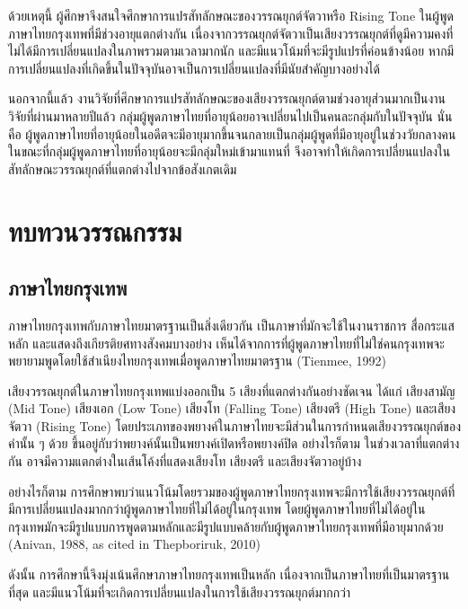 \documentclass[a4paper]{article}
\begin{document}
    ด้วยเหตุนี้ ผู้ศึกษาจึงสนใจศึกษาการแปรสัทลักษณะของวรรณยุกต์จัตวาหรือ Rising Tone ในผู้พูดภาษาไทยกรุงเทพที่มีช่วงอายุแตกต่างกัน เนื่องจากวรรณยุกต์จัตวาเป็นเสียงวรรณยุกต์ที่ดูมีความคงที่ ไม่ได้มีการเปลี่ยนแปลงในภาพรวมตามเวลามากนัก และมีแนวโน้มที่จะมีรูปแปรที่ค่อนข้างน้อย หากมีการเปลี่ยนแปลงที่เกิดขึ้นในปัจจุบันอาจเป็นการเปลี่ยนแปลงที่มีนัยสำคัญบางอย่างได้

    นอกจากนี้แล้ว งานวิจัยที่ศึกษาการแปรสัทลักษณะของเสียงวรรณยุกต์ตามช่วงอายุส่วนมากเป็นงานวิจัยที่ผ่านมาหลายปีแล้ว กลุ่มผู้พูดภาษาไทยที่อายุน้อยอาจเปลี่ยนไปเป็นคนละกลุ่มกับในปัจจุบัน นั่นคือ ผู้พูดภาษาไทยที่อายุน้อยในอดีตจะมีอายุมากขึ้นจนกลายเป็นกลุ่มผู้พูดที่มีอายุอยู่ในช่วงวัยกลางคน ในขณะที่กลุ่มผู้พูดภาษาไทยที่อายุน้อยจะมีกลุ่มใหม่เข้ามาแทนที่ จึงอาจทำให้เกิดการเปลี่ยนแปลงในสัทลักษณะวรรณยุกต์ที่แตกต่างไปจากข้อสังเกตเดิม
\section{ทบทวนวรรณกรรม}
\subsection{ภาษาไทยกรุงเทพ}
    ภาษาไทยกรุงเทพกับภาษาไทยมาตรฐานเป็นสิ่งเดียวกัน เป็นภาษาที่มักจะใช้ในงานราชการ สื่อกระแสหลัก และแสดงถึงเกียรติยศทางสังคมบางอย่าง เห็นได้จากการที่ผู้พูดภาษาไทยที่ไม่ใช่คนกรุงเทพจะพยายามพูดโดยใช้สำเนียงไทยกรุงเทพเมื่อพูดภาษาไทยมาตรฐาน (Tienmee, 1992)

    เสียงวรรณยุกต์ในภาษาไทยกรุงเทพแบ่งออกเป็น 5 เสียงที่แตกต่างกันอย่างชัดเจน ได้แก่ เสียงสามัญ (Mid Tone) เสียงเอก (Low Tone) เสียงโท (Falling Tone) เสียงตรี (High Tone) และเสียงจัตวา (Rising Tone) โดยประเภทของพยางค์ในภาษาไทยจะมีส่วนในการกำหนดเสียงวรรณยุกต์ของคำนั้น ๆ ด้วย ขึ้นอยู่กับว่าพยางค์นั้นเป็นพยางค์เปิดหรือพยางค์ปิด อย่างไรก็ตาม ในช่วงเวลาที่แตกต่างกัน อาจมีความแตกต่างในเส้นโค้งที่แสดงเสียงโท เสียงตรี และเสียงจัตวาอยู่บ้าง

    อย่างไรก็ตาม การศึกษาพบว่าแนวโน้มโดยรวมของผู้พูดภาษาไทยกรุงเทพจะมีการใช้เสียงวรรณยุกต์ที่มีการเปลี่ยนแปลงมากกว่าผู้พูดภาษาไทยที่ไม่ได้อยู่ในกรุงเทพ โดยผู้พูดภาษาไทยที่ไม่ได้อยู่ในกรุงเทพมักจะมีรูปแบบการพูดตามหลักและมีรูปแบบคล้ายกับผู้พูดภาษาไทยกรุงเทพที่มีอายุมากด้วย (Anivan, 1988, as cited in Thepboriruk, 2010)

    ดังนั้น การศึกษานี้จึงมุ่งเน้นศึกษาภาษาไทยกรุงเทพเป็นหลัก เนื่องจากเป็นภาษาไทยที่เป็นมาตรฐานที่สุด และมีแนวโน้มที่จะเกิดการเปลี่ยนแปลงในการใช้เสียงวรรณยุกต์มากกว่า
\end{document}
